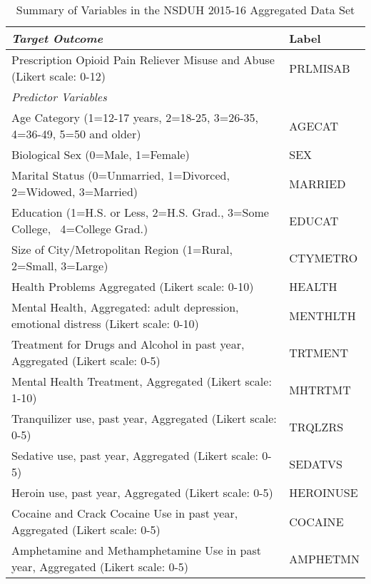 \documentclass[sigconf]{acmart}
\begin{document}

\begin{table*}[ht]
  \caption{Summary of Variables in the NSDUH 2015-16 Aggregated Data Set}
  \label{tab:freq}
  \begin{tabular}{ll}
    \toprule
    \textit{Target Outcome} & Label \\
    \midrule
    Prescription Opioid Pain Reliever Misuse and Abuse 
    (Likert scale: 0-12)& PRLMISAB  \\
    \midrule
    \textit{Predictor Variables}&   \\
    \midrule
    Age Category (1=12-17 years, 2=18-25, 3=26-35, 4=36-49, 5=50 and older)& AGECAT \\
    Biological Sex (0=Male, 1=Female)& SEX  \\
    Marital Status (0=Unmarried, 1=Divorced, 2=Widowed, 3=Married)& MARRIED  \\
    Education (1=H.S. or Less, 2=H.S. Grad., 3=Some College,  4=College Grad.)& EDUCAT  \\
    Size of City/Metropolitan Region (1=Rural, 2=Small, 3=Large)& CTYMETRO  \\
    Health Problems Aggregated  (Likert scale: 0-10)& HEALTH  \\
    Mental Health, Aggregated: adult depression, emotional distress 
    (Likert scale: 0-10)& MENTHLTH  \\
    Treatment for Drugs and Alcohol in past year, Aggregated 
    (Likert scale: 0-5)& TRTMENT  \\
    Mental Health Treatment, Aggregated (Likert scale: 1-10)& MHTRTMT  \\
    Tranquilizer use, past year, Aggregated (Likert scale: 0-5)& TRQLZRS \\
    Sedative use, past year, Aggregated (Likert scale: 0-5)& SEDATVS  \\
    Heroin use, past year, Aggregated (Likert scale: 0-5)& HEROINUSE  \\
    Cocaine and Crack Cocaine Use in past year, Aggregated  
    (Likert scale: 0-5)& COCAINE  \\
    Amphetamine and Methamphetamine Use in past year, Aggregated 
    (Likert scale: 0-5)& AMPHETMN  \\
    \bottomrule
  \end{tabular}
\end{table*}

\end{document}
